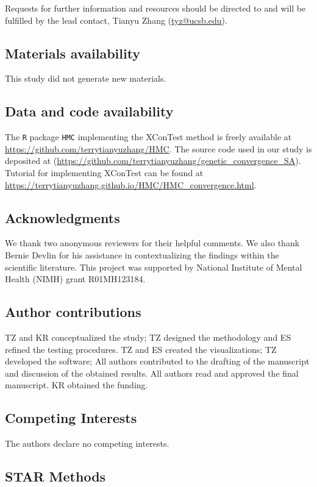 \documentclass[11pt]{article}
\begin{document}
Requests for further information and resources should be directed to and will
be fulfilled by the lead contact, Tianyu Zhang (\url{tyz@ucsb.edu}).

\subsection*{Materials availability}
This study did not generate new materials.

\subsection*{Data and code availability}
The \texttt{R} package \texttt{HMC} implementing the XConTest method is freely available at \url{https://github.com/terrytianyuzhang/HMC}. The source code used in our study is deposited at (\url{https://github.com/terrytianyuzhang/genetic_convergence_SA}). Tutorial for implementing XConTest can be found at \url{https://terrytianyuzhang.github.io/HMC/HMC_convergence.html}.

\subsection*{Acknowledgments}
We thank two anonymous reviewers for their helpful comments. We also thank Bernie Devlin for his assistance in contextualizing the findings within the scientific literature. This project was supported by National Institute of Mental Health (NIMH) grant R01MH123184.

\subsection*{Author contributions}
	TZ and KR conceptualized the study; TZ designed the methodology and ES refined the testing procedures.
	TZ and ES created the visualizations; TZ developed the software; All authors contributed to the drafting of the manuscript and discussion of the obtained results. All authors read and approved the final manuscript. 
    KR obtained the funding.

\subsection*{Competing Interests}
The authors declare no competing interests.

\subsection*{STAR Methods}
\end{document}
